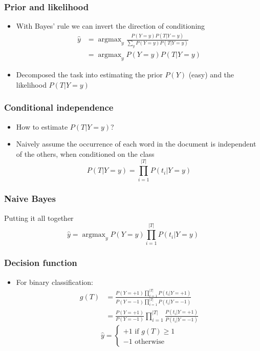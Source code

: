 \documentclass[14pt,mathserif]{beamer}
\DeclareMathOperator*{\argmax}{argmax}
\begin{document}
\begin{frame}
  \frametitle{Prior and likelihood}
  \begin{itemize}
  \item With Bayes' rule we can invert the direction of conditioning
\begin{align}\nonumber
\hat{y} & = \argmax_y \frac{P(Y=y)P(T|Y=y)}{\sum_y P(Y=y)P(T|Y=y) }\\\nonumber
        & = \argmax_y P(Y=y)P(T|Y=y)
\end{align}
\item Decomposed the task into estimating the prior $P(Y)$ (easy) and
  the likelihood $P(T|Y=y)$
  \end{itemize}
\end{frame}


\begin{frame}
  \frametitle{Conditional independence}
  \begin{itemize}
  \item How to estimate $P(T|Y=y)$?
  \item \alert{Naively} assume the occurrence of each word in the
    document is independent of the others, when conditioned on the
    class
    \[
    P(T|Y=y) = \prod_{i=1}^{|T|} P(t_i|Y=y)
    \]
  \end{itemize}
\end{frame}



\begin{frame}\frametitle{Naive Bayes}
  \begin{block}{Putting it all together}
    \[
   \hat{y} = \argmax_y P(Y=y)\prod_{i=1}^{|T|} P(t_i|Y=y)
    \]
\end{block}
\end{frame}


\begin{frame}\frametitle{Decision function}
\begin{itemize}
  \item For binary classification:
    \begin{align}\nonumber
    g(T) & = \frac{P(Y=+1)\prod_{i=1}^{|T|} P(t_i|Y=+1)}
                {P(Y=-1)\prod_{i=1}^{|T|} P(t_i|Y=-1)}\\\nonumber
         & = \frac{P(Y=+1)}{P(Y=-1)}\prod_{i=1}^{|T|} \frac{P(t_i|Y=+1)}{P(t_i|Y=-1)}
    \end{align}
    \[
    \hat{y} = 
    \begin{cases}
      +1 \text{ if } g(T) \geq 1\\
      -1 \text{ otherwise }
    \end{cases}
    \]
  \end{itemize}
\end{frame}
\end{document}
